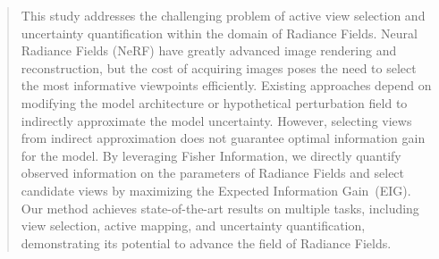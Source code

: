 \begin{abstract}
This study addresses the challenging problem of active view selection and uncertainty quantification within the domain of Radiance Fields. Neural Radiance Fields (NeRF) have greatly advanced image rendering and reconstruction, but the cost of acquiring images poses the need to select the most informative viewpoints efficiently.
Existing approaches depend on modifying the model architecture or hypothetical perturbation field to indirectly approximate the model uncertainty. However, selecting views from indirect approximation does not guarantee optimal information gain for the model.
By leveraging Fisher Information, we directly quantify observed information on the parameters of Radiance Fields and select candidate views by maximizing the Expected Information Gain~(EIG).
Our method achieves state-of-the-art results on multiple tasks, including view selection, active mapping, and uncertainty quantification, demonstrating its potential to advance the field of Radiance Fields. 
\end{abstract}
